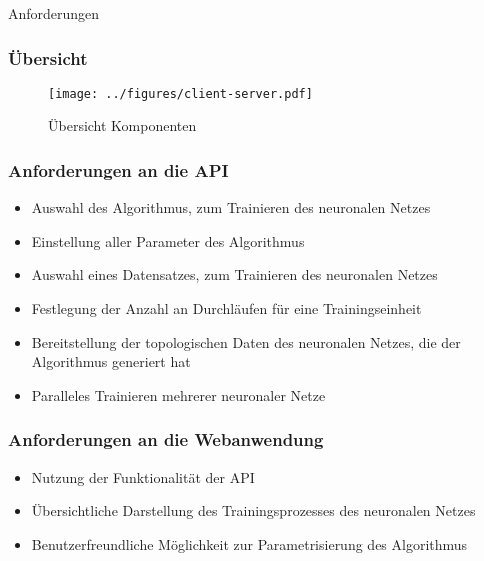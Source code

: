 \begin{frame}
    \begin{center}
        \Huge{Anforderungen}
    \end{center}
\end{frame}
\begin{frame}
    \frametitle{Übersicht}
    \begin{figure}[h]
        \centering
        \texttt{[image: ../figures/client-server.pdf]}
        \caption{Übersicht Komponenten}
    \end{figure}
\end{frame}
\begin{frame}
    \frametitle{Anforderungen an die API}
    \begin{itemize}
        \item Auswahl des Algorithmus, zum Trainieren des neuronalen Netzes
        \item Einstellung aller Parameter des Algorithmus
        \item Auswahl eines Datensatzes, zum Trainieren des neuronalen Netzes
        \item Festlegung der Anzahl an Durchläufen für eine Trainingseinheit
        \item Bereitstellung der topologischen Daten des neuronalen Netzes, die der Algorithmus generiert hat
        \item Paralleles Trainieren mehrerer neuronaler Netze
    \end{itemize}
\end{frame}
\begin{frame}
    \frametitle{Anforderungen an die Webanwendung}
    \begin{itemize}
        \item Nutzung der Funktionalität der API
        \item Übersichtliche Darstellung des Trainingsprozesses des neuronalen Netzes
        \item Benutzerfreundliche Möglichkeit zur Parametrisierung des Algorithmus
    \end{itemize}
\end{frame}
